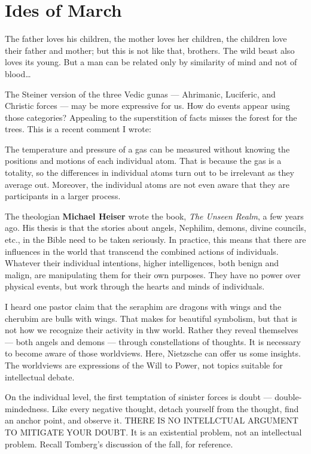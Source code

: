 \section{Ides of March}

\begin{quotex}
The father loves his children, the mother loves her children, the children love their father and mother; but this is not like that, brothers. The wild beast also loves its young. But a man can be related only by similarity of mind and not of blood… 

\end{quotex}
The Steiner version of the three Vedic gunas — Ahrimanic, Luciferic, and Christic forces — may be more expressive for us. How do events appear using those categories? Appealing to the superstition of facts misses the forest for the trees. This is a recent comment I wrote:

The temperature and pressure of a gas can be measured without knowing the positions and motions of each individual atom. That is because the gas is a totality, so the differences in individual atoms turn out to be irrelevant as they average out. Moreover, the individual atoms are not even aware that they are participants in a larger process.

The theologian \textbf{Michael Heiser} wrote the book, \emph{The Unseen Realm}, a few years ago. His thesis is that the stories about angels, Nephilim, demons, divine councils, etc., in the Bible need to be taken seriously. In practice, this means that there are influences in the world that transcend the combined actions of individuals. Whatever their individual intentions, higher intelligences, both benign and malign, are manipulating them for their own purposes. They have no power over physical events, but work through the hearts and minds of individuals.

I heard one pastor claim that the seraphim are dragons with wings and the cherubim are bulls with wings. That makes for beautiful symbolism, but that is not how we recognize their activity in thw world. Rather they reveal themselves — both angels and demons — through constellations of thoughts. It is necessary to become aware of those worldviews. Here, Nietzsche can offer us some insights. The worldviews are expressions of the Will to Power, not topics suitable for intellectual debate.

On the individual level, the first temptation of sinister forces is doubt — double-mindedness. Like every negative thought, detach yourself from the thought, find an anchor point, and observe it. THERE IS NO INTELLCTUAL ARGUMENT TO MITIGATE YOUR DOUBT. It is an existential problem, not an intellectual problem. Recall Tomberg's discussion of the fall, for reference.

